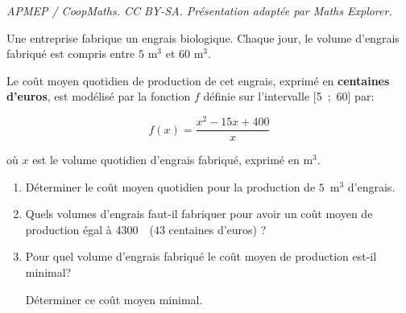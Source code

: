 \documentclass[10pt]{article}
\providecommand{\euro}{\texteuro}
\providecommand{\np}[2][]{{#2~#1}}
\providecommand{\euro}{{\text{€}}}
\renewcommand{\euro}{\ifmmode\text{\texteuro}\else\texteuro\fi}
\begin{document}
\noindent\textit{APMEP / CoopMaths. CC BY-SA. Présentation adaptée par Maths Explorer.}\par\medskip
\medskip
 
Une entreprise fabrique un engrais biologique. Chaque jour, le volume d'engrais fabriqué est compris entre $5$ m$^3$ et 60 m$^3$.

Le coût moyen quotidien de production de cet engrais, exprimé en \textbf{centaines d'euros}, est modélisé par la fonction $f$ définie sur l'intervalle [5~;~60] par:

\[f(x) = \dfrac{x^2- 15x +400}{x}\]

où $x$ est le volume quotidien d'engrais fabriqué, exprimé en m$^3$.

\medskip

\begin{enumerate}
\item Déterminer le coût moyen quotidien pour la production de $5$~m$^3$ d'engrais.
\item Quels volumes d'engrais faut-il fabriquer pour avoir un coût moyen de
production égal à \np{4300}~\euro{}($43$ centaines d'euros) ?
\item Pour quel volume d'engrais fabriqué le coût moyen de production est-il
minimal? 

Déterminer ce coût moyen minimal.
\end{enumerate}
\end{document}
